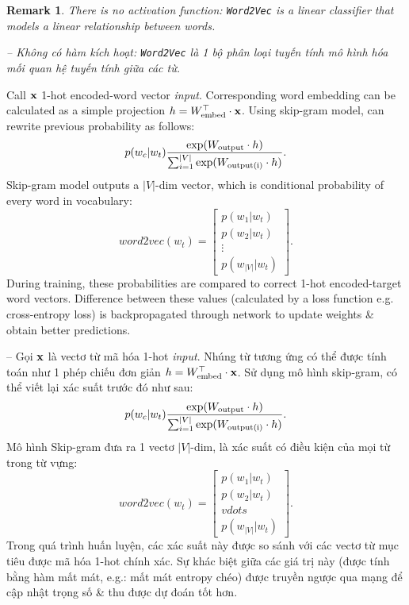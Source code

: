 \documentclass{article}
\newtheorem{remark}{Remark}
\begin{document}
\begin{itemize}
\begin{itemize}
\begin{itemize}
            \begin{remark}
                There is no activation function: {\tt Word2Vec} is a linear classifier that models a linear relationship between words.

                -- Không có hàm kích hoạt: {\tt Word2Vec} là 1 bộ phân loại tuyến tính mô hình hóa mối quan hệ tuyến tính giữa các từ.
            \end{remark}
            Call ${\bf x}$ 1-hot encoded-word vector {\it input}. Corresponding word embedding can be calculated as a simple projection $h = W_{\rm embed}^\top\cdot{\bf x}$. Using skip-gram model, can rewrite previous probability as follows:
            \begin{equation*}
                p(w_c|w_t) \frac{\exp(W_{\rm output}\cdot h)}{\sum_{i=1}^{|V|} \exp(W_{\rm output(i)}\cdot h)}.
            \end{equation*}
            Skip-gram model outputs a $|V|$-dim vector, which is conditional probability of every word in vocabulary:
            \begin{equation*}
                word2vec(w_t) = \begin{bmatrix}
                    p(w_1|w_t)\\p(w_2|w_t)\\\vdots\\p(w_{|V|}|w_t)
                \end{bmatrix}.
            \end{equation*}
            During training, these probabilities are compared to correct 1-hot encoded-target word vectors. Difference between these values (calculated by a loss function e.g. cross-entropy loss) is backpropagated through network to update weights \& obtain better predictions.

            -- Gọi ${\bf x}$ là vectơ từ mã hóa 1-hot {\it input}. Nhúng từ tương ứng có thể được tính toán như 1 phép chiếu đơn giản $h = W_{\rm embed}^\top\cdot{\bf x}$. Sử dụng mô hình skip-gram, có thể viết lại xác suất trước đó như sau:
            \begin{equation*}
                p(w_c|w_t) \frac{\exp(W_{\rm output}\cdot h)}{\sum_{i=1}^{|V|} \exp(W_{\rm output(i)}\cdot h)}.
            \end{equation*}
            Mô hình Skip-gram đưa ra 1 vectơ $|V|$-dim, là xác suất có điều kiện của mọi từ trong từ vựng:
            \begin{equation*}
                word2vec(w_t) = \begin{bmatrix}
                    p(w_1|w_t)\\p(w_2|w_t)\\vdots\\p(w_{|V|}|w_t)
                \end{bmatrix}.
            \end{equation*}
            Trong quá trình huấn luyện, các xác suất này được so sánh với các vectơ từ mục tiêu được mã hóa 1-hot chính xác. Sự khác biệt giữa các giá trị này (được tính bằng hàm mất mát, e.g.: mất mát entropy chéo) được truyền ngược qua mạng để cập nhật trọng số \& thu được dự đoán tốt hơn.


\end{itemize}
\end{itemize}
\end{itemize}
\end{document}
